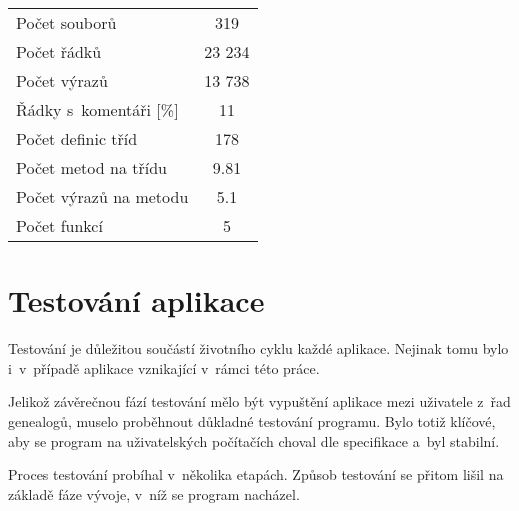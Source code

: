 	\begin{center}
		\begin{tabular}{||l|S[table-format=6.2]||}
			\hline
			Počet souborů          & 319 \\
			Počet řádků            & 23 234 \\
			Počet výrazů           & 13 738 \\
			Řádky s~komentáři [\%] & 11 \\
			Počet definic tříd     &  178 \\
			Počet metod na třídu   & 9.81 \\
			Počet výrazů na metodu & 5.1 \\
			Počet funkcí           & 5 \\
			\hline
		\end{tabular}
	\end{center}



\chapter{Testování aplikace}
\label{chap:test}
Testování je důležitou součástí životního cyklu každé aplikace. Nejinak tomu bylo i~v~případě aplikace vznikající v~rámci této práce. \par
Jelikož závěrečnou fází testování mělo být vypuštění aplikace mezi uživatele z~řad genealogů, muselo proběhnout důkladné testování programu. Bylo totiž klíčové, aby se program na uživatelských počítačích choval dle specifikace a~byl stabilní.\par
Proces testování probíhal v~několika etapách. Způsob testování se přitom lišil na základě fáze vývoje, v~níž se program nacházel. \par 

